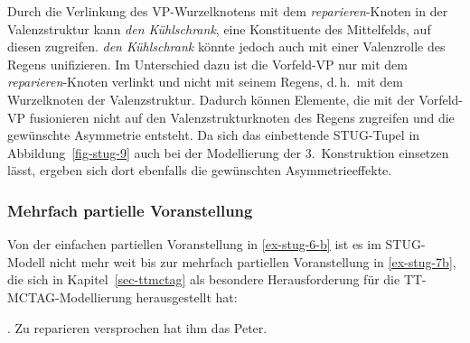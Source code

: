 \largerpage%
Durch die Verlinkung des VP-Wurzelknotens mit dem {\it reparieren}-Knoten in der Valenzstruktur kann {\it den Kühlschrank}, eine Konstituente des Mittelfelds, auf diesen zugreifen. {\it den Kühlschrank} könnte jedoch auch mit einer Valenzrolle des Regens unifizieren. Im Unterschied dazu ist die Vorfeld-VP nur mit dem {\it reparieren}-Knoten verlinkt und nicht mit seinem Regens, d.\,h.\ mit dem Wurzelknoten der Valenzstruktur. Dadurch können Elemente, die mit der Vorfeld-VP fusionieren nicht auf den Valenzstrukturknoten des Regens zugreifen und die gewünschte Asymmetrie entsteht. Da sich das einbettende STUG-Tupel in Abbildung~\ref{fig-stug-9} auch bei der Modellierung der 3.~Konstruktion einsetzen lässt, ergeben sich dort ebenfalls die gewünschten Asymmetrieeffekte. 
\largerpage%

\subsubsection*{Mehrfach partielle Voranstellung}

Von der einfachen partiellen Voranstellung in \ref{ex-stug-6-b} ist es im STUG-Modell nicht mehr weit bis zur mehrfach partiellen Voranstellung in \ref{ex-stug-7b}, die sich in Kapitel~\ref{sec-ttmctag} als besondere Herausforderung für die TT-MCTAG-Modellierung herausgestellt hat:  

\ex. \label{ex-stug-7b} Zu reparieren versprochen hat ihm das Peter.

